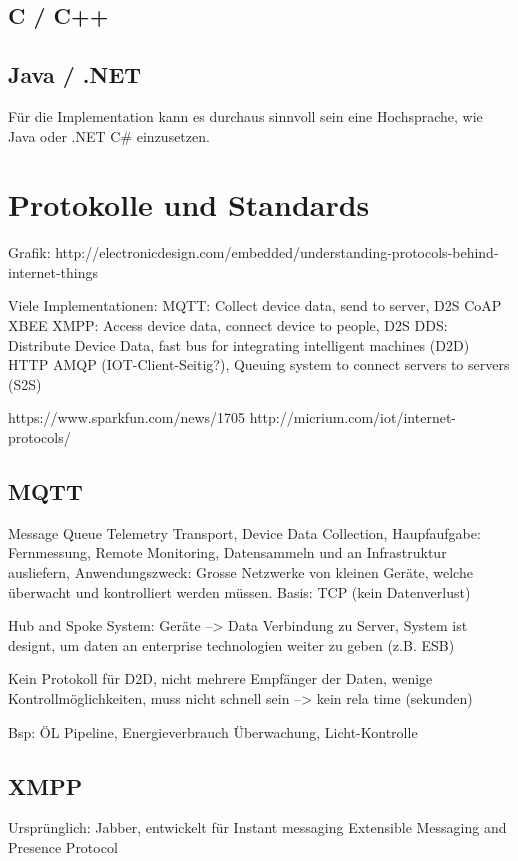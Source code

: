 \subsection{C / C++}


\subsection{Java / .NET}
Für die Implementation kann es durchaus sinnvoll sein eine Hochsprache, wie Java oder .NET C\# einzusetzen. 

\section{Protokolle und Standards}

Grafik: http://electronicdesign.com/embedded/understanding-protocols-behind-internet-things 

Viele Implementationen:
MQTT: Collect device data, send to server, D2S
CoAP
XBEE
XMPP: Access device data, connect device to people, D2S
DDS: Distribute Device Data, fast bus for integrating intelligent machines (D2D)
HTTP
AMQP (IOT-Client-Seitig?), Queuing system to connect servers to servers (S2S)

https://www.sparkfun.com/news/1705
http://micrium.com/iot/internet-protocols/

\subsection{MQTT}
Message Queue Telemetry Transport, Device Data Collection, Haupfaufgabe: Fernmessung, Remote Monitoring, Datensammeln und an Infrastruktur ausliefern, Anwendungszweck: Grosse Netzwerke von kleinen Geräte, welche überwacht und kontrolliert werden müssen. Basis: TCP (kein Datenverlust)

Hub and Spoke System: Geräte --> Data Verbindung zu Server, System ist designt, um daten an enterprise technologien weiter zu geben (z.B. ESB)

Kein Protokoll für D2D, nicht mehrere Empfänger der Daten, wenige Kontrollmöglichkeiten, muss nicht schnell sein --> kein rela time (sekunden)


Bsp: ÖL Pipeline, Energieverbrauch Überwachung, Licht-Kontrolle

\subsection{XMPP}
Ursprünglich: Jabber, entwickelt für Instant messaging
Extensible Messaging and Presence Protocol

